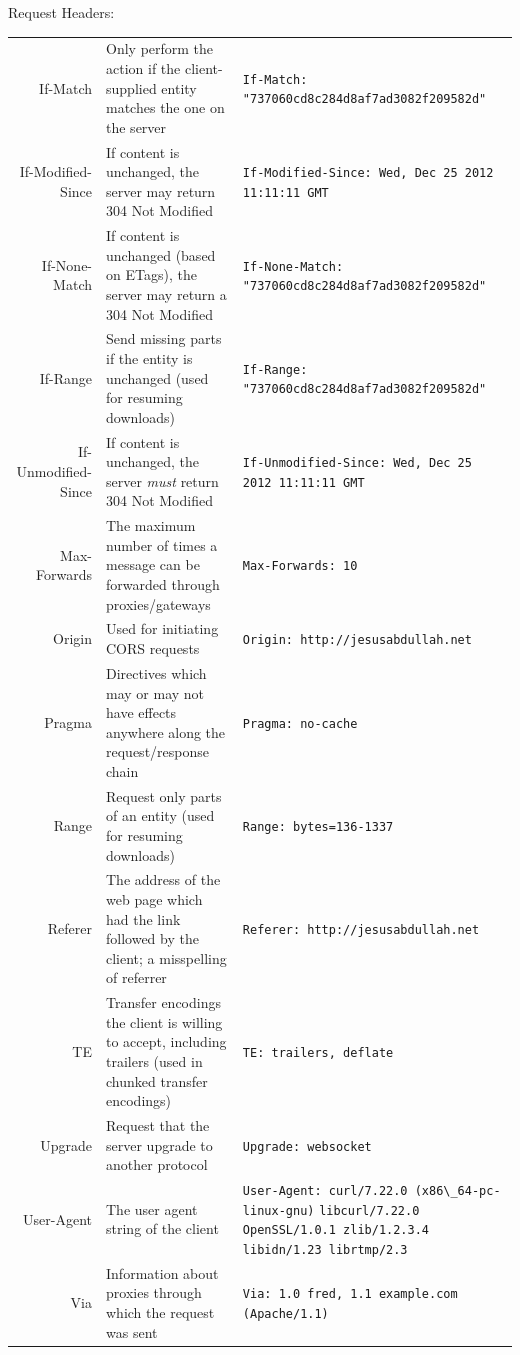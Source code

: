 \documentclass[final]{beamer}
\newcommand{\header}[1]{\texttt{\lstinline!#1!}}
\begin{document}
\begin{frame}{}
\begin{columns}
\begin{column}{0.4\textwidth}
\begin{block}{\huge{Request Headers:}}
\begin{tabular}{r p{} p{}}
            If-Match & Only perform the action if the client-supplied entity matches the one on the server & \header{If-Match: "737060cd8c284d8af7ad3082f209582d" } \\
            If-Modified-Since & If content is unchanged, the server may return 304 Not Modified & \header{If-Modified-Since: Wed, Dec 25 2012 11:11:11 GMT } \\
            If-None-Match & If content is unchanged (based on ETags), the server may return a 304 Not Modified & \header{If-None-Match: "737060cd8c284d8af7ad3082f209582d" } \\
            If-Range & Send missing parts if the entity is unchanged (used for resuming downloads) & \header{If-Range: "737060cd8c284d8af7ad3082f209582d" } \\
            If-Unmodified-Since & If content is unchanged, the server \emph{must} return 304 Not Modified & \header{If-Unmodified-Since: Wed, Dec 25 2012 11:11:11 GMT } \\
            Max-Forwards & The maximum number of times a message can be forwarded through proxies/gateways & \header{Max-Forwards: 10 } \\
            Origin & Used for initiating CORS requests & \header{Origin: http://jesusabdullah.net } \\
            Pragma & Directives which may or may not have effects anywhere along the request/response chain & \header{Pragma: no-cache } \\
            Range & Request only parts of an entity (used for resuming downloads) & \header{Range: bytes=136-1337} \\
            Referer & The address of the web page which had the link followed by the client; a misspelling of referrer & \header{Referer: http://jesusabdullah.net } \\
            TE & Transfer encodings the client is willing to accept, including trailers (used in chunked transfer encodings) & \header{TE: trailers, deflate } \\
            Upgrade & Request that the server upgrade to another protocol & \header{Upgrade: websocket } \\
            User-Agent & The user agent string of the client & \header{User-Agent: curl/7.22.0 (x86\_64-pc-linux-gnu)} \header{libcurl/7.22.0 OpenSSL/1.0.1 zlib/1.2.3.4} \header{libidn/1.23 librtmp/2.3} \\
            Via & Information about proxies through which the request was sent & \header{Via: 1.0 fred, 1.1 example.com (Apache/1.1) } \\

\end{tabular}
\end{block}
\end{column}
\end{columns}
\end{frame}
\end{document}
